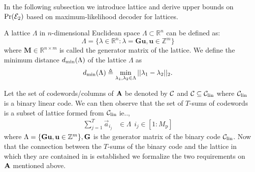 In the following subsection we introduce lattice and derive upper bounds on $\mathrm{Pr}(\mathcal{E}_2)$ based on maximum-likelihood decoder for lattices.
\begin{definition}
A lattice $\Lambda$ in $n$-dimensional Euclidean space $\Lambda\subset \mathbb{R}^{n}$ can be defined as:
\begin{equation}
\Lambda =\{\lambda\in\mathbb{R}^{n}:\lambda=\mathbf{G}\mathbf{u},\mathbf{u}\in \mathbb{Z}^{m}\}
\end{equation}
where $\mathbf{M}\in\mathbb{R}^{n \times m}$ is called the generator matrix of the lattice. We define the minimum distance $d_{\mathrm{min}}(\Lambda)$ of the lattice $\Lambda$ as 
\[
d_{\mathrm{min}}(\Lambda)\triangleq \min_{\lambda_1, \lambda_2\in\Lambda } ||\lambda_1-\lambda_2||_2.
\]
\end{definition}

Let the set of codewords/columns of $\mathbf{A}$ be denoted by $\mathcal{C}$ and $\mathcal{C}\subseteq \mathcal{C}_{\text{lin}}$ where $\mathcal{C}_{\text{lin}}$ is a binary linear code. We can then observe that the set of $T$-sums of codewords is a subset of lattice formed from $\mathcal{C}_{\text{lin}}$ ie..,
\begin{align*}
\sum_{j=1}^{T}\vec{a}_{i_j}&\in \Lambda ~~ i_j\in[1:M_\mathrm{p}]
\end{align*}
where $\Lambda =\{\mathbf{G}\mathbf{u},\mathbf{u}\in \mathbb{Z}^{m}\}, \mathbf{G}$ is the generator matrix of the binary code $\mathcal{C}_{\text{lin}}$. Now that the connection between the $T$-sums of the binary code and the lattice in which they are contained in is established we formalize the two requirements on $\mathbf{A}$ mentioned above.


